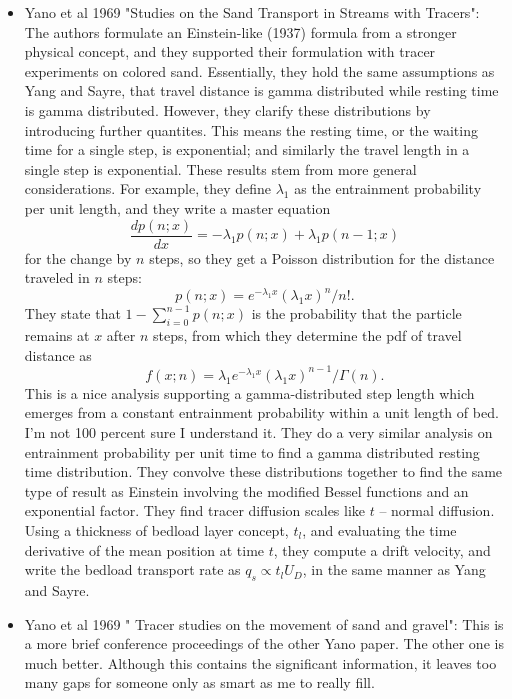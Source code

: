 \documentclass{article}
\begin{document}
\begin{itemize}
\item Yano et al 1969 "Studies on the Sand Transport in Streams with Tracers": 
The authors formulate an Einstein-like (1937) formula from a stronger physical concept, and they supported their formulation with tracer experiments on colored sand. Essentially, they hold the same assumptions as Yang and Sayre, that travel distance is gamma distributed while resting time is gamma distributed. However, they clarify these distributions by introducing further quantites. 
This means the resting time, or the waiting time for a single step, is exponential; and similarly the travel length in a single step is exponential. These results stem from more general considerations. 
For example, they define $\lambda_1$ as the entrainment probability per unit length, and they write a master equation 
$$ \frac{dp(n;x)}{dx} = -\lambda_1 p(n;x) + \lambda_1 p(n-1;x)$$ for the change by $n$ steps, so they get a Poisson distribution for the distance traveled in $n$ steps: 
$$ p(n;x) = e^{-\lambda_1 x} (\lambda_1 x)^n/{n!}.$$
They state that $1-\sum_{i=0}^{n-1} p(n;x)$ is the probability that the particle remains at $x$ after $n$ steps, from which they determine the pdf of travel distance as 
$$ f(x;n) = \lambda_1 e^{-\lambda_1 x}(\lambda_1 x)^{n-1}/\Gamma(n). $$
This is a nice analysis supporting a gamma-distributed step length which emerges from a constant entrainment probability within a unit length of bed. 
I'm not 100 percent sure I understand it. 
They do a very similar analysis on entrainment probability per unit time to find a gamma distributed resting time distribution. 
They convolve these distributions together to find the same type of result as Einstein involving the modified Bessel functions and an exponential factor. 
They find tracer diffusion scales like $t$ -- normal diffusion. 
Using a thickness of bedload layer concept, $t_l$, and evaluating the time derivative of the mean position at time $t$, they compute a drift velocity, and write the bedload transport rate as $q_s \propto t_l U_D$, in the same manner as Yang and Sayre. 

\item Yano et al 1969 " Tracer studies on the movement of sand and gravel": 
This is a more brief conference proceedings of the other Yano paper. The other one is much better. Although this contains the significant information, it leaves too many gaps for someone only as smart as me to really fill. 


\end{itemize}
\end{document}
